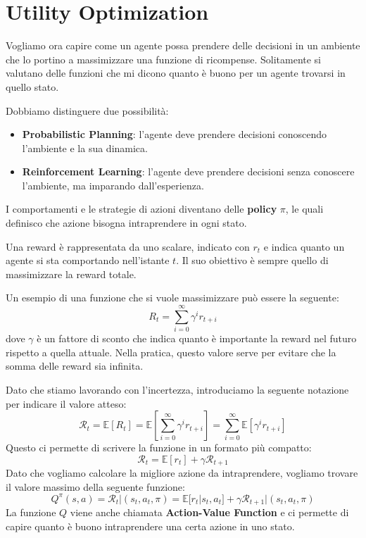\section{Utility Optimization}
Vogliamo ora capire come un agente possa prendere delle decisioni in un ambiente 
che lo portino a massimizzare una funzione di ricompense. Solitamente si valutano 
delle funzioni che mi dicono quanto è buono per un agente trovarsi in quello stato.

Dobbiamo distinguere due possibilità:
\begin{itemize}
    \item \textbf{Probabilistic Planning}: l'agente deve prendere decisioni
          conoscendo l'ambiente e la sua dinamica.
    \item \textbf{Reinforcement Learning}: l'agente deve prendere decisioni senza
          conoscere l'ambiente, ma imparando dall'esperienza.
\end{itemize}
I comportamenti e le strategie di azioni diventano delle \textbf{policy} $\pi$,
le quali definisco che azione bisogna intraprendere in ogni stato.

Una reward è rappresentata da uno scalare, indicato con $r_t$ e indica quanto 
un agente si sta comportando nell'istante $t$. Il suo obiettivo è sempre quello 
di massimizzare la reward totale.

Un esempio di una funzione che si vuole massimizzare può essere la seguente:
\begin{equation}
    R_t = \sum_{i=0}^{\infty} \gamma^i r_{t + i}
\end{equation}
dove $\gamma$ è un fattore di sconto che indica quanto è importante la reward
nel futuro rispetto a quella attuale. Nella pratica, questo valore serve per 
evitare che la somma delle reward sia infinita.

Dato che stiamo lavorando con l'incertezza, introduciamo la seguente notazione 
per indicare il valore atteso:
\begin{equation}
    \mathcal{R}_t = \mathbb{E}[R_t] = \mathbb{E}\left[\sum_{i=0}^{\infty} 
    \gamma^i r_{t + i}\right] = \sum_{i = 0}^{\infty} \mathbb{E}[\gamma^i r_{t + i}]
\end{equation}
Questo ci permette di scrivere la funzione in un formato più compatto:
\begin{equation}
    \mathcal{R}_t = \mathbb{E}[r_t] + \gamma \mathcal{R}_{t + 1} 
\end{equation}
Dato che vogliamo calcolare la migliore azione da intraprendere, vogliamo trovare 
il valore massimo della seguente funzione:
\begin{equation}
    Q^{\pi}(s, a) = \mathcal{R}_t |(s_t, a_t, \pi) = \mathbb{E}[r_t | s_t, a_t] 
    + \gamma \mathcal{R}_{t + 1} | (s_t, a_t, \pi)
\end{equation}
La funzione $Q$ viene anche chiamata \textbf{Action-Value Function} e ci permette
di capire quanto è buono intraprendere una certa azione in uno stato.

